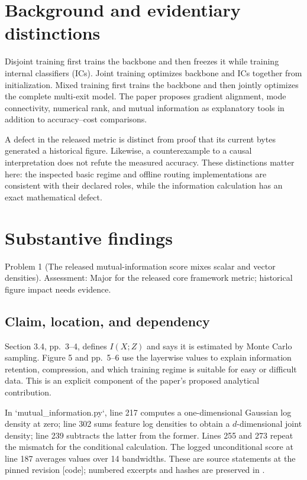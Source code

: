 \documentclass[10pt]{article}
\begin{document}
\section*{Background and evidentiary distinctions}
Disjoint training first trains the backbone and then freezes it while training internal classifiers (ICs). Joint training optimizes backbone and ICs together from initialization. Mixed training first trains the backbone and then jointly optimizes the complete multi-exit model. The paper proposes gradient alignment, mode connectivity, numerical rank, and mutual information as explanatory tools in addition to accuracy–cost comparisons.\par
A defect in the released metric is distinct from proof that its current bytes generated a historical figure. Likewise, a counterexample to a causal interpretation does not refute the measured accuracy. These distinctions matter here: the inspected basic regime and offline routing implementations are consistent with their declared roles, while the information calculation has an exact mathematical defect.\par
\section*{Substantive findings}
Problem 1 (The released mutual-information score mixes scalar and vector densities).  Assessment: Major for the released core framework metric; historical figure impact needs evidence.\par
\subsection*{Claim, location, and dependency}
Section 3.4, pp. 3–4, defines \(I(X;Z)\) and says it is estimated by Monte Carlo sampling. Figure 5 and pp. 5–6 use the layerwise values to explain information retention, compression, and which training regime is suitable for easy or difficult data. This is an explicit component of the paper’s proposed analytical contribution.\par
In `mutual\_information.py`, line 217 computes a one-dimensional Gaussian log density at zero; line 302 sums feature log densities to obtain a \(d\)-dimensional joint density; line 239 subtracts the latter from the former. Lines 255 and 273 repeat the mismatch for the conditional calculation. The logged unconditional score at line 187 averages values over 14 bandwidths. These are source statements at the pinned revision [code]; numbered excerpts and hashes are preserved in .\par
\end{document}
